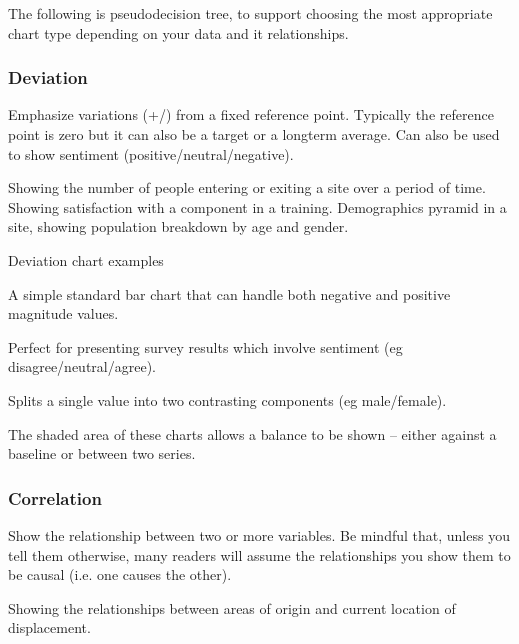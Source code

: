 \documentclass[letterpaper,10pt,english]{jupyterBook}
\begin{document}
\sphinxAtStartPar
The following is pseudo\sphinxhyphen{}decision tree, to support choosing the most appropriate chart type depending on your data and it relationships.


\subsubsection{Deviation}
\label{\detokenize{part1/communication:deviation}}
\sphinxAtStartPar
Emphasize variations (+/\sphinxhyphen{}) from a fixed reference point. Typically the reference point is zero but it can also be a target or a long\sphinxhyphen{}term average. Can also be used to show sentiment (positive/neutral/negative).

\sphinxAtStartPar
{} Showing the number of people entering or exiting a site over a period of time. Showing satisfaction with a component in a training. Demographics pyramid in a site, showing population breakdown by age and gender.

\sphinxAtStartPar
Deviation chart examples

\sphinxAtStartPar
{} A simple standard bar chart that can handle both negative and positive magnitude values.

\sphinxAtStartPar
{} Perfect for presenting survey results which involve sentiment (eg disagree/neutral/agree).

\sphinxAtStartPar
{} Splits a single value into two contrasting components (eg male/female).

\sphinxAtStartPar
{} The shaded area of these charts allows a balance to be shown – either against a
baseline or between two series.


\subsubsection{Correlation}
\label{\detokenize{part1/communication:correlation}}
\sphinxAtStartPar
Show the relationship between two or more variables. Be mindful that, unless you tell them otherwise, many readers
will assume the relationships you show them to be causal (i.e. one causes the other).

\sphinxAtStartPar
{} Showing the relationships between areas of origin and current location of displacement.
\end{document}
